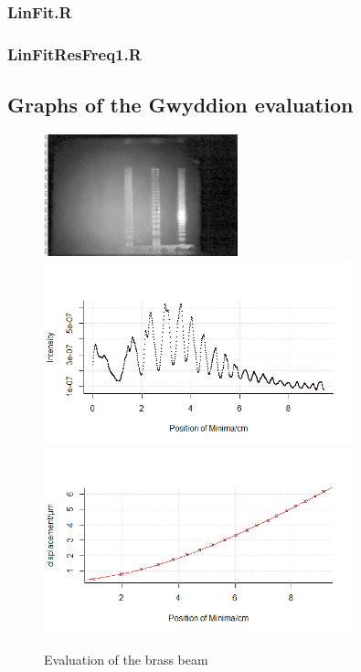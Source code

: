\subsubsection*{LinFit.R}

\subsubsection*{LinFitResFreq1.R}


\subsection{Graphs of the Gwyddion evaluation}
\label{gwyddion}
\begin{figure}
	\centering
	\includegraphics[width=0.5\textwidth]{../figures/Stab3gwid.png}
	\includegraphics[width=0.8\textwidth]{../figures/Stab3R1.png}
	\includegraphics[width=0.8\textwidth]{../figures/Stab3R2.png}
	\caption{Evaluation of the brass beam}
\end{figure}
